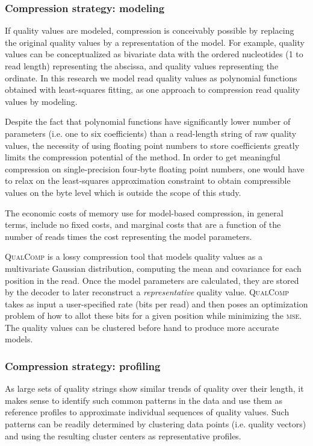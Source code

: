 \documentclass[12pt,\mydriver]{thesis}
\begin{document}
\subsubsection{Compression strategy: modeling}

If quality values are modeled, compression is conceivably possible by
replacing the original quality values by a representation of the
model. For example, quality values can be conceptualized as bivariate
data with the ordered nucleotides (1 to read length) representing the
abscissa, and quality values representing the ordinate. In this
research we model read quality values as polynomial functions obtained
with least-squares fitting, as one approach to compression read
quality values by modeling.

Despite the fact that polynomial functions have significantly lower
number of parameters (i.e. one to six coefficients) than a read-length
string of raw quality values, the necessity of using floating point
numbers to store coefficients greatly limits the compression potential
of the method. In order to get meaningful compression on
single-precision four-byte floating point numbers, one would have to
relax on the least-squares approximation constraint to obtain
compressible values on the byte level which is outside the scope of
this study.

The economic costs of memory use for model-based compression, in
general terms, include no fixed costs, and marginal costs that are a
function of the number of reads times the cost representing the model
parameters.

\textsc{QualComp} is a lossy compression tool that models quality values as a multivariate Gaussian distribution, computing the mean and covariance for each position in the read\cite{Ochoa:2013rt}.
Once the model parameters are calculated, they are stored by the decoder to later reconstruct a \emph{representative} quality value.
\textsc{QualComp} takes as input a user-specified rate (bits per read) and then poses an optimization problem of how to allot these bits for a given position while minimizing the \textsc{mse}.
The quality values can be clustered before hand to produce more accurate models.

\subsubsection{Compression strategy: profiling}

As large sets of quality strings show similar trends of quality over
their length, it makes sense to identify such common patterns in the
data and use them as reference profiles to approximate individual
sequences of quality values. Such patterns can be readily determined by
clustering data points (i.e. quality vectors) and using the resulting
cluster centers as representative profiles.
\end{document}
